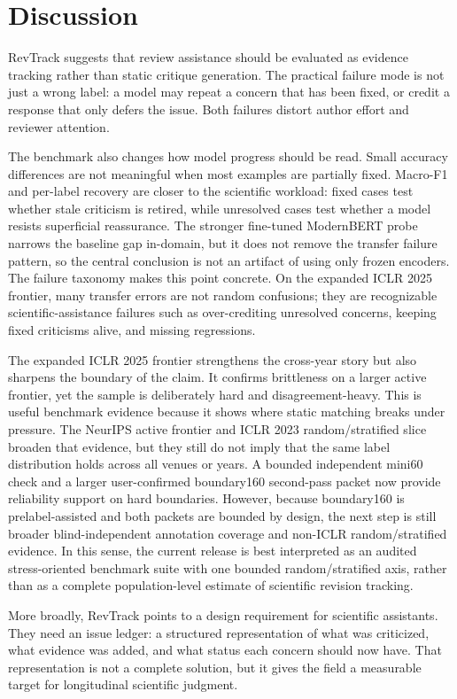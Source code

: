 \section{Discussion}

RevTrack suggests that review assistance should be evaluated as evidence tracking rather than static critique generation.
The practical failure mode is not just a wrong label: a model may repeat a concern that has been fixed, or credit a response that only defers the issue.
Both failures distort author effort and reviewer attention.

The benchmark also changes how model progress should be read.
Small accuracy differences are not meaningful when most examples are partially fixed.
Macro-F1 and per-label recovery are closer to the scientific workload: fixed cases test whether stale criticism is retired, while unresolved cases test whether a model resists superficial reassurance.
The stronger fine-tuned ModernBERT probe narrows the baseline gap in-domain, but it does not remove the transfer failure pattern, so the central conclusion is not an artifact of using only frozen encoders.
The failure taxonomy makes this point concrete.
On the expanded ICLR 2025 frontier, many transfer errors are not random confusions; they are recognizable scientific-assistance failures such as over-crediting unresolved concerns, keeping fixed criticisms alive, and missing regressions.

The expanded ICLR 2025 frontier strengthens the cross-year story but also sharpens the boundary of the claim.
It confirms brittleness on a larger active frontier, yet the sample is deliberately hard and disagreement-heavy.
This is useful benchmark evidence because it shows where static matching breaks under pressure.
The NeurIPS active frontier and ICLR 2023 random/stratified slice broaden that evidence, but they still do not imply that the same label distribution holds across all venues or years.
A bounded independent mini60 check and a larger user-confirmed boundary160 second-pass packet now provide reliability support on hard boundaries.
However, because boundary160 is prelabel-assisted and both packets are bounded by design, the next step is still broader blind-independent annotation coverage and non-ICLR random/stratified evidence.
In this sense, the current release is best interpreted as an audited stress-oriented benchmark suite with one bounded random/stratified axis, rather than as a complete population-level estimate of scientific revision tracking.

More broadly, RevTrack points to a design requirement for scientific assistants.
They need an issue ledger: a structured representation of what was criticized, what evidence was added, and what status each concern should now have.
That representation is not a complete solution, but it gives the field a measurable target for longitudinal scientific judgment.
